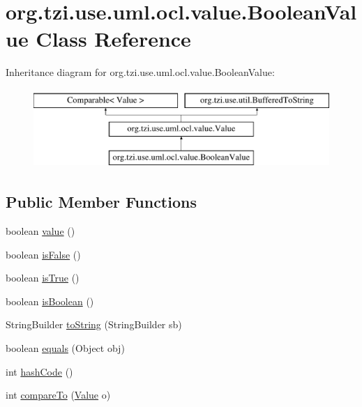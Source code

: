 \hypertarget{classorg_1_1tzi_1_1use_1_1uml_1_1ocl_1_1value_1_1_boolean_value}{\section{org.\-tzi.\-use.\-uml.\-ocl.\-value.\-Boolean\-Value Class Reference}
\label{classorg_1_1tzi_1_1use_1_1uml_1_1ocl_1_1value_1_1_boolean_value}
}
Inheritance diagram for org.\-tzi.\-use.\-uml.\-ocl.\-value.\-Boolean\-Value\-:\begin{figure}[H]
\begin{center}
\leavevmode
\includegraphics[height=3.000000cm]{classorg_1_1tzi_1_1use_1_1uml_1_1ocl_1_1value_1_1_boolean_value}
\end{center}
\end{figure}
\subsection*{Public Member Functions}
\begin{DoxyCompactItemize}
\item 
boolean \hyperlink{classorg_1_1tzi_1_1use_1_1uml_1_1ocl_1_1value_1_1_boolean_value_ab4e6081511ddfb123053848e912c16b2}{value} ()
\item 
boolean \hyperlink{classorg_1_1tzi_1_1use_1_1uml_1_1ocl_1_1value_1_1_boolean_value_a797b663b908b7b43070884a0cbb6a24d}{is\-False} ()
\item 
boolean \hyperlink{classorg_1_1tzi_1_1use_1_1uml_1_1ocl_1_1value_1_1_boolean_value_af866d8950cd0b92f685ee78baba43f95}{is\-True} ()
\item 
boolean \hyperlink{classorg_1_1tzi_1_1use_1_1uml_1_1ocl_1_1value_1_1_boolean_value_a0656d79a798a2e20d6f292cbf6dc0e30}{is\-Boolean} ()
\item 
String\-Builder \hyperlink{classorg_1_1tzi_1_1use_1_1uml_1_1ocl_1_1value_1_1_boolean_value_a92a1e05504bc83590f92111dcd3f5997}{to\-String} (String\-Builder sb)
\item 
boolean \hyperlink{classorg_1_1tzi_1_1use_1_1uml_1_1ocl_1_1value_1_1_boolean_value_ab89df9e5ce5a3a713dca5aee3cfd6fbc}{equals} (Object obj)
\item 
int \hyperlink{classorg_1_1tzi_1_1use_1_1uml_1_1ocl_1_1value_1_1_boolean_value_a0fd7cc40bbd1c5c14691b27184a09a6e}{hash\-Code} ()
\item 
int \hyperlink{classorg_1_1tzi_1_1use_1_1uml_1_1ocl_1_1value_1_1_boolean_value_aad658bf61dc422be6cd86576ec1ecf1a}{compare\-To} (\hyperlink{classorg_1_1tzi_1_1use_1_1uml_1_1ocl_1_1value_1_1_value}{Value} o)
\end{DoxyCompactItemize}
